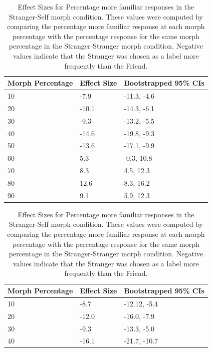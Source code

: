\documentclass[10pt,letterpaper]{article}
\begin{document}
\begin{table}[ht]
\caption{\color{Gray} Effect Sizes for Percentage more familiar, “Identity B”, responses in the Stranger-Friend morph condition. These values were computed by comparing the percentage more familiar response at each morph percentage with the percentage response for the same morph percentage in the Stranger-Stranger morph condition. Negative values indicate that the Stranger was chosen as a label more frequently than the Friend. }
\label{Table 5}
\begin{center}
\begin{tabular}{ | m{3.5cm} | m{5cm}| m{3.5cm} | } 
\hline
\textbf{Morph Percentage} & \textbf{Effect Size} & \textbf{Bootstrapped 95\% CIs} \\ 
\hline
10 & -7.9 & -11.3, -4.6 \\
\hline
20 & -10.1 & -14.3, -6.1 \\
\hline
30 & -9.3 & -13.2, -5.5 \\
\hline
40 & -14.6 & -19.8, -9.3 \\
\hline
50 & -13.6 & -17.1, -9.9 \\
\hline
60 & 5.3 & -0.3, 10.8 \\
\hline
70 & 8.3 & 4.5, 12.3 \\
\hline
80 & 12.6 & 8.3, 16.2 \\
\hline
90 & 9.1 & 5.9, 12.3 \\
\hline
\end{tabular}
\end{center}
\vspace{0.5cm} 
\caption{\color{Gray} Effect Sizes for Percentage more familiar responses in the Stranger-Self morph condition. These values were computed by comparing the percentage more familiar response at each morph percentage with the percentage response for the same morph percentage in the Stranger-Stranger morph condition. Negative values indicate that the Stranger was chosen as a label more frequently than the Friend. }
\label{Table 6}
\begin{center}
\begin{tabular}{ | m{3.5cm} | m{5cm}| m{3.5cm} | } 
\hline
\textbf{Morph Percentage} & \textbf{Effect Size} & \textbf{Bootstrapped 95\% CIs} \\ 
\hline
10 & -8.7 & -12.12, -5.4 \\
\hline
20 & -12.0 & -16.0, -7.9 \\
\hline
30 & -9.3 & -13.3, -5.0 \\
\hline
40 & -16.1 & -21.7, -10.7 \\

\end{tabular}
\end{center}
\end{table}
\end{document}
